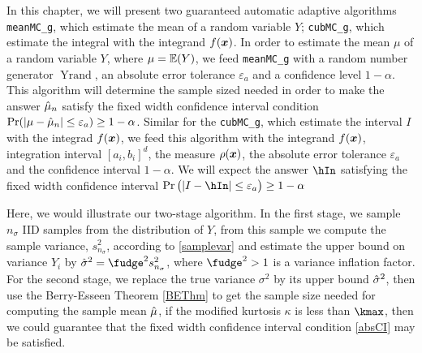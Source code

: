 \documentclass{iitthesis}
\DeclareMathOperator{\Yrand}{Yrand}
\begin{document}
\label{chapter:meanMCabsg}
In this chapter, we will present two guaranteed automatic adaptive algorithms {\tt meanMC\_g}, which estimate the mean of a random variable $Y$; {\tt cubMC\_g}, which estimate the integral with the integrand $f(\boldsymbol{x})$. In order to estimate the mean $\mu$ of a random variable $Y$, where $\mu = \mathbb{E}(Y)$, we feed {\tt meanMC\_g} with a random number generator $\Yrand$, an absolute error tolerance $\varepsilon_a$ and a confidence level $1-\alpha$. This algorithm will determine the sample sized needed in order to make the answer $\hat{\mu}_n$ satisfy the fixed width confidence interval condition $\Pr (\left \lvert \mu-\hat{\mu}_n \right \rvert \leq \varepsilon_a) \geq 1-\alpha$. Similar for the {\tt cubMC\_g}, which estimate the interval $I$ with the integrad $f(\boldsymbol{x})$, we feed this algorithm with the integrand $f(\boldsymbol{x})$, integration interval $[a_i,b_i]^d$, the measure $\rho(\boldsymbol{x})$, the absolute error tolerance $\varepsilon_a$ and the confidence interval $1-\alpha$. We will expect the answer $\hIn$ satisfying the fixed width confidence interval $\Pr \left(\abs{I-\hIn} \leq \varepsilon_a\right) \geq 1-\alpha$



Here, we would illustrate our two-stage algorithm. In the first stage, we sample $n_\sigma$ IID samples from the distribution of $Y$, from this sample we compute the sample variance, $s_{n_\sigma}^2$, according to \eqref{samplevar} and estimate the upper bound on variance $Y_i$ by $\hsigma^2 = \fudge^2s_{n_{\sigma}}^2$, where $\fudge^2>1$ is a variance inflation factor. For the second stage, we replace the true variance $\sigma^2$ by its upper bound $\hat{\sigma}^2$, then use the Berry-Esseen Theorem \ref{BEThm} to get the sample size needed for computing the sample mean $\hat{\mu}$, if the modified kurtosis $\kappa$ is less than $\kmax$, then we could guarantee that the fixed width confidence interval condition \eqref{absCI} may be satisfied.
\end{document}
